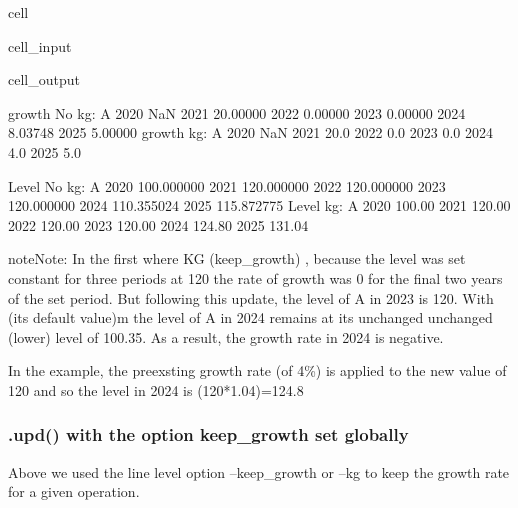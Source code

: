 \documentclass[letterpaper,10pt,english]{jupyterBook}
\begin{document}
\begin{sphinxuseclass}{cell}
\begin{sphinxVerbatimInput}
\begin{sphinxuseclass}{cell_input}
\end{sphinxuseclass}\end{sphinxVerbatimInput}
\begin{sphinxVerbatimOutput}

\begin{sphinxuseclass}{cell_output}
\begin{sphinxVerbatim}[commandchars=\\\{\}]
growth No kg:
             A
2020       NaN
2021  20.00000
2022   0.00000
2023   0.00000
2024  \PYGZhy{}8.03748
2025   5.00000
growth kg:
         A
2020   NaN
2021  20.0
2022   0.0
2023   0.0
2024   4.0
2025   5.0


Level No kg:
               A
2020  100.000000
2021  120.000000
2022  120.000000
2023  120.000000
2024  110.355024
2025  115.872775
Level kg:
           A
2020  100.00
2021  120.00
2022  120.00
2023  120.00
2024  124.80
2025  131.04
\end{sphinxVerbatim}

\end{sphinxuseclass}\end{sphinxVerbatimOutput}

\end{sphinxuseclass}
\begin{sphinxadmonition}{note}{Note:}
\sphinxAtStartPar
In the first where KG (keep\_growth) , because the level was set constant for three periods at 120 the rate of growth was 0 for the final two years of the set period.  But following this update, the level of A in 2023 is 120. With  (its default value)m the level of A in 2024 remains at its unchanged  unchanged (lower) level of 100.35. As a result, the growth rate in 2024 is negative.

\sphinxAtStartPar
In the  example, the pre\sphinxhyphen{}exsting growth rate (of 4\%) is applied to the new value of 120 and so the level in 2024 is (120*1.04)=124.8
\end{sphinxadmonition}


\subsubsection{.upd() with the option keep\_growth set globally}
\label{\detokenize{content/04_PythonEssentials/UpdateCommand:upd-with-the-option-keep-growth-set-globally}}
\sphinxAtStartPar
Above we used the line level option –keep\_growth or –kg to keep the growth rate for a given operation.
\end{document}
